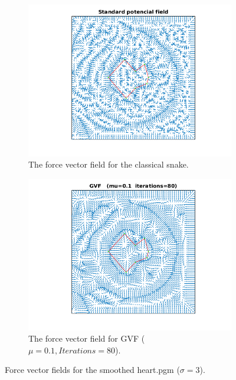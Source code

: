 \documentclass{article}
\begin{document}
\begin{figure}[H]
\centering
\begin{subfigure}{0.49\textwidth}
  \centering
  \includegraphics[width=\linewidth]{fig9a.png}
  \caption{The force vector field for the classical snake.}
  \label{fig9a}
\end{subfigure}
\begin{subfigure}{0.49\textwidth}
  \centering
  \includegraphics[width=\linewidth]{fig9b.png}
  \caption{The force vector field for GVF ($\mu = 0.1, Iterations=80$).}
  \label{fig9b}
\end{subfigure}
\caption{Force vector fields for the smoothed heart.pgm ($\sigma=3$).}
\label{fig9}
\end{figure}
\end{document}
